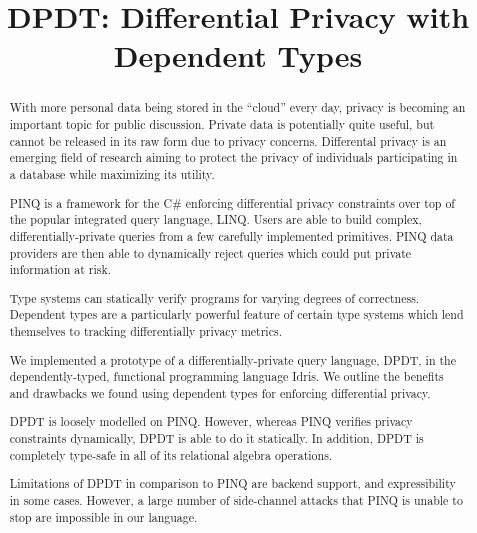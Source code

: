 \documentclass[12pt]{report}
\title{DPDT: Differential Privacy with Dependent Types}
\begin{document}
\maketitle



\graphicspath{{assets/}}

\begin{abstract}
With more personal data being stored in the ``cloud'' every day, privacy is becoming an important topic for public discussion.
Private data is potentially quite useful, but cannot be released in its raw form due to privacy concerns.
Differental privacy is an emerging field of research aiming to protect the privacy of individuals participating in a database while maximizing its utility.

PINQ is a framework for the C\# enforcing differential privacy constraints over top of the popular integrated query language, LINQ.
Users are able to build complex, differentially-private queries from a few carefully implemented primitives.
PINQ data providers are then able to dynamically reject queries which could put private information at risk.

Type systems can statically verify programs for varying degrees of correctness.
Dependent types are a particularly powerful feature of certain type systems which lend themselves to tracking differentially privacy metrics.

We implemented a prototype of a differentially-private query language, DPDT, in the dependently-typed, functional programming language Idris.
We outline the benefits and drawbacks we found using dependent types for enforcing differential privacy.

DPDT is loosely modelled on PINQ.
However, whereas PINQ verifies privacy constraints dynamically, DPDT is able to do it statically.
In addition, DPDT is completely type-safe in all of its relational algebra operations.

Limitations of DPDT in comparison to PINQ are backend support, and expressibility in some cases.
However, a large number of side-channel attacks that PINQ is unable to stop are impossible in our language.
\end{abstract}
\end{document}
